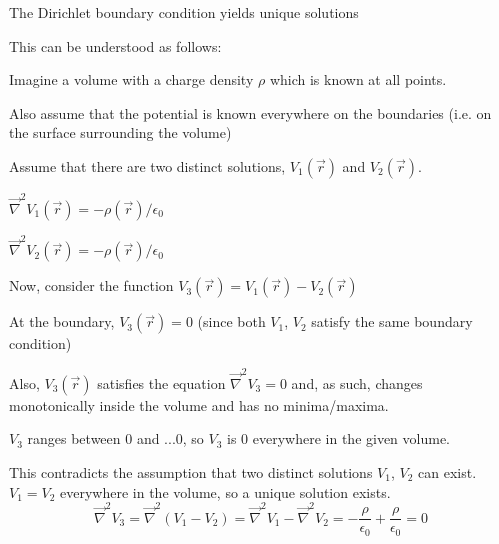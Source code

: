\begin{frame}{The Dirichlet boundary condition yields unique solutions}

This can be understood as follows:\\
\begin{itemize}
{\small
  \item Imagine a volume with a charge density $\rho$ which is known at all points.
  \item Also assume that the potential is known everywhere on the boundaries (i.e. on the surface surrounding the volume)
  \item Assume that there are two distinct solutions, $V_{1}(\vec{r})$ and $V_{2}(\vec{r})$.
    \begin{itemize}
    {\small
       \item $\vec{\nabla}^{2}V_1(\vec{r}) = -\rho(\vec{r})/\epsilon_0$
       \item $\vec{\nabla}^{2}V_2(\vec{r}) = -\rho(\vec{r})/\epsilon_0$
    }
    \end{itemize}
  \item Now, consider the function $V_{3}(\vec{r}) = V_{1}(\vec{r}) - V_{2}(\vec{r})$
    \begin{itemize}
    {\small
      \item At the boundary, $V_{3}(\vec{r}) = 0$ (since both $V_1$, $V_2$ satisfy the same boundary condition)
      \item Also, $V_{3}(\vec{r})$ satisfies the equation $\vec{\nabla}^{2}V_{3} = 0$ and, as such, changes monotonically inside the volume and has no minima/maxima.
    }
    \end{itemize}
  \item $V_3$ ranges between 0 and ...0, so $V_3$ is 0 everywhere in the given volume.
  \item This contradicts the assumption that two distinct solutions $V_1$, $V_2$ can exist.
        $V_1 = V_2$ everywhere in the volume, so a unique solution exists.
    \begin{equation*}
      \vec{\nabla}^{2}V_{3} = \vec{\nabla}^{2}(V_1-V_2) = \vec{\nabla}^{2}V_1 - \vec{\nabla}^{2}V_2 = - \frac{\rho}{\epsilon_0} + \frac{\rho}{\epsilon_0} = 0
    \end{equation*}
}
\end{itemize}

\end{frame}


